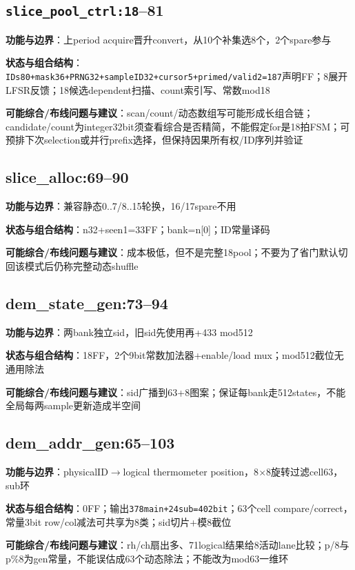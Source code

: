 \documentclass[UTF8,fontset=fandol,10pt,a4paper,openany]{ctexrep}
\newcommand{\code}[1]{\nolinkurl{#1}}
\begin{document}
\subsection*{\code{slice_pool_ctrl:18}–81}
\noindent\textbf{功能与边界}：上period acquire晋升convert，从10个补集选8个，2个spare参与\par
\noindent\textbf{状态与组合结构}：\code{IDs80+mask36+PRNG32+sampleID32+cursor5+primed/valid2=187}声明FF；8展开LFSR反馈；18候选dependent扫描、count索引写、常数mod18\par
\noindent\textbf{可能综合/布线问题与建议}：scan/count/动态数组写可能形成长组合链；candidate/count为integer32bit须查看综合是否精简，不能假定for是18拍FSM；可预排下次selection或并行prefix选择，但保持因果所有权/ID序列并验证\par
\subsection*{slice\_alloc:69–90}
\noindent\textbf{功能与边界}：兼容静态0..7/8..15轮换，16/17spare不用\par
\noindent\textbf{状态与组合结构}：n32+seen1=33FF；bank=n[0]；ID常量译码\par
\noindent\textbf{可能综合/布线问题与建议}：成本极低，但不是完整18pool；不要为了省门默认切回该模式后仍称完整动态shuffle\par
\subsection*{dem\_state\_gen:73–94}
\noindent\textbf{功能与边界}：两bank独立sid，旧sid先使用再+433 mod512\par
\noindent\textbf{状态与组合结构}：18FF，2个9bit常数加法器+enable/load mux；mod512截位无通用除法\par
\noindent\textbf{可能综合/布线问题与建议}：sid广播到63+8图案；保证每bank走512states，不能全局每两sample更新造成半空间\par
\subsection*{dem\_addr\_gen:65–103}
\noindent\textbf{功能与边界}：physicalID\ensuremath{\rightarrow}logical thermometer position，8\ensuremath{\times}8旋转过滤cell63，sub环\par
\noindent\textbf{状态与组合结构}：0FF；输出\code{378main+24sub=402bit}；63个cell compare/correct，常量3bit row/col减法可共享为8类；sid切片+模8截位\par
\noindent\textbf{可能综合/布线问题与建议}：rh/ch扇出多、71logical结果给8活动lane比较；p/8与p\%8为gen常量，不能误估成63个动态除法；不能改为mod63一维环\par
\end{document}
